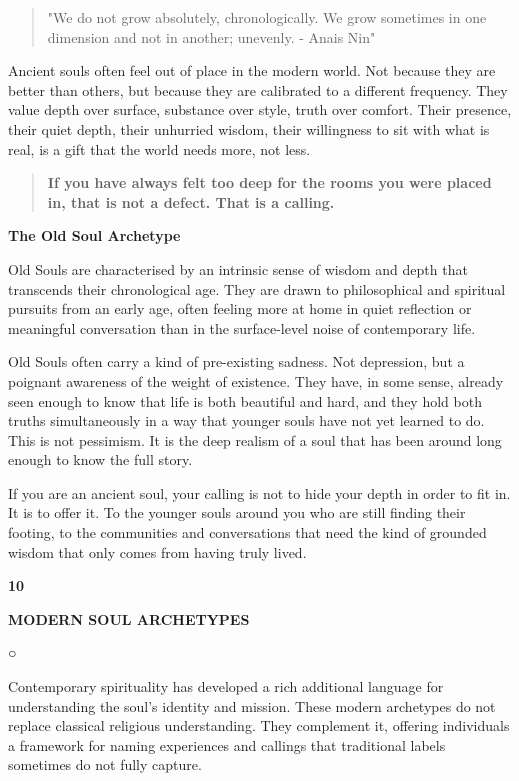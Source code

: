 \begin{quote}
"We do not grow absolutely, chronologically. We grow sometimes in one
dimension and not in another; unevenly. - Anais Nin"
\end{quote}

Ancient souls often feel out of place in the modern world. Not because
they are better than others, but because they are calibrated to a
different frequency. They value depth over surface, substance over
style, truth over comfort. Their presence, their quiet depth, their
unhurried wisdom, their willingness to sit with what is real, is a gift
that the world needs more, not less.

\begin{quote}
\textbf{If you have always felt too deep for the rooms you were placed
in, that is not a defect. That is a calling.}
\end{quote}

\textbf{The Old Soul Archetype}

Old Souls are characterised by an intrinsic sense of wisdom and depth
that transcends their chronological age. They are drawn to philosophical
and spiritual pursuits from an early age, often feeling more at home in
quiet reflection or meaningful conversation than in the surface-level
noise of contemporary life.

Old Souls often carry a kind of pre-existing sadness. Not depression,
but a poignant awareness of the weight of existence. They have, in some
sense, already seen enough to know that life is both beautiful and hard,
and they hold both truths simultaneously in a way that younger souls
have not yet learned to do. This is not pessimism. It is the deep
realism of a soul that has been around long enough to know the full
story.

If you are an ancient soul, your calling is not to hide your depth in
order to fit in. It is to offer it. To the younger souls around you who
are still finding their footing, to the communities and conversations
that need the kind of grounded wisdom that only comes from having truly
lived.

\textbf{10}

\textbf{MODERN SOUL ARCHETYPES}

○

Contemporary spirituality has developed a rich additional language for
understanding the soul's identity and mission. These modern archetypes
do not replace classical religious understanding. They complement it,
offering individuals a framework for naming experiences and callings
that traditional labels sometimes do not fully capture.

